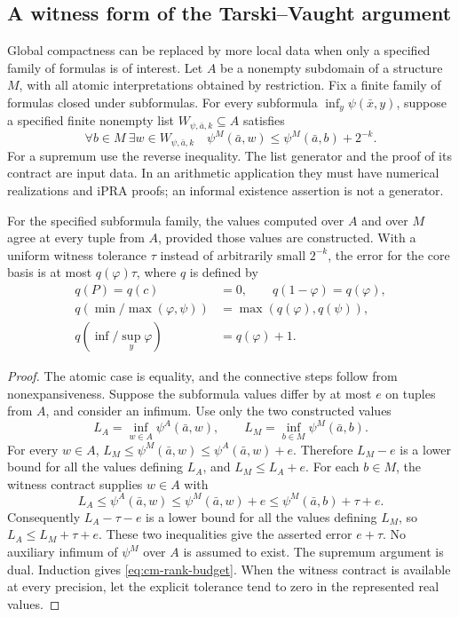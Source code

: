 \subsection{A witness form of the Tarski--Vaught argument}

Global compactness can be replaced by more local data when only a
specified family of formulas is of interest. Let $A$ be a nonempty
subdomain of a structure $M$, with all atomic interpretations obtained
by restriction. Fix a finite family of formulas closed under
subformulas. For every subformula $\inf_y\psi(\bar x,y)$, suppose a
specified finite nonempty list $W_{\psi,\bar a,k}\subseteq A$ satisfies
\begin{equation}
 \forall b\in M\ \exists w\in W_{\psi,\bar a,k}\quad
 \psi^M(\bar a,w)\leq\psi^M(\bar a,b)+2^{-k}.
 \label{eq:cm-witness-test}
\end{equation}
For a supremum use the reverse inequality. The list generator and
the proof of its contract are input data. In an arithmetic application
they must have numerical realizations and iPRA proofs; an informal
existence assertion is not a generator.

\begin{proposition}
\label{prop:cm-tarski-vaught}
For the specified subformula family, the values computed over $A$
and over $M$ agree at every tuple from $A$, provided those values
are constructed. With a uniform witness tolerance $\tau$ instead of
arbitrarily small $2^{-k}$, the error for the core basis is at most
$q(\varphi)\tau$, where $q$ is defined by
\begin{equation}
\begin{aligned}
 q(P)=q(c)&=0,\qquad q(1-\varphi)=q(\varphi),\\
 q(\min/\max(\varphi,\psi))&=\max(q(\varphi),q(\psi)),\\
 q(\inf/\sup_y\varphi)&=q(\varphi)+1.
\end{aligned}
 \label{eq:cm-rank-budget}
\end{equation}
\end{proposition}
\begin{proof}
The atomic case is equality, and the connective steps follow from
nonexpansiveness. Suppose the subformula values differ by at most
$e$ on tuples from $A$, and consider an infimum. Use only the two
constructed values
\[
 L_A=\inf_{w\in A}\psi^A(\bar a,w),\qquad
 L_M=\inf_{b\in M}\psi^M(\bar a,b).
\]
For every $w\in A$,
$L_M\leq\psi^M(\bar a,w)\leq\psi^A(\bar a,w)+e$.
Therefore $L_M-e$ is a lower bound for all the values defining
$L_A$, and $L_M\leq L_A+e$.
For each $b\in M$, the witness contract supplies $w\in A$ with
\[
 L_A\leq\psi^A(\bar a,w)
      \leq\psi^M(\bar a,w)+e
      \leq\psi^M(\bar a,b)+\tau+e.
\]
Consequently $L_A-\tau-e$ is a lower bound for all the values
defining $L_M$, so $L_A\leq L_M+\tau+e$.
These two inequalities give the asserted error $e+\tau$.
No auxiliary infimum of $\psi^M$ over $A$ is assumed to exist.
The supremum argument is dual.
Induction gives \eqref{eq:cm-rank-budget}.
When the witness contract is available at every precision, let the
explicit tolerance tend to zero in the represented real values.
\end{proof}

